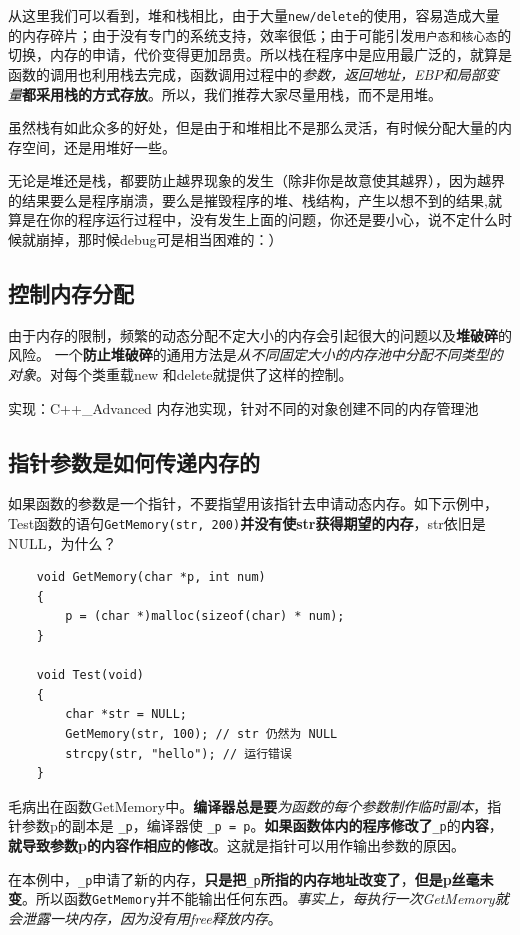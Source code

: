 \documentclass[UTF8,a4paper,12pt]{ctexbook}
\begin{document}
				从这里我们可以看到，堆和栈相比，由于大量\verb|new/delete|的使用，容易造成大量的内存碎片；由于没有专门的系统支持，效率很低；由于可能引发\verb|用户态和核心态|的切换，内存的申请，代价变得更加昂贵。所以栈在程序中是应用最广泛的，就算是函数的调用也利用栈去完成，函数调用过程中的\textit{参数，返回地址，EBP和局部变量}\textbf{都采用栈的方式存放}。所以，我们推荐大家尽量用栈，而不是用堆。
				
				虽然栈有如此众多的好处，但是由于和堆相比不是那么灵活，有时候分配大量的内存空间，还是用堆好一些。
				
				无论是堆还是栈，都要防止越界现象的发生（除非你是故意使其越界），因为越界的结果要么是程序崩溃，要么是摧毁程序的堆、栈结构，产生以想不到的结果,就算是在你的程序运行过程中，没有发生上面的问题，你还是要小心，说不定什么时候就崩掉，那时候debug可是相当困难的：）
		
		\subsection{控制内存分配}
		
			由于内存的限制，频繁的动态分配不定大小的内存会引起很大的问题以及\textbf{堆破碎}的风险。
			一个\textbf{防止堆破碎}的通用方法是\textit{从不同固定大小的内存池中分配不同类型的对象}。对每个类重载new 和delete就提供了这样的控制。
			
			实现：C++\_Advanced 内存池实现，针对不同的对象创建不同的内存管理池
			

		\subsection{指针参数是如何传递内存的}
			如果函数的参数是一个指针，不要指望用该指针去申请动态内存。如下示例中，Test函数的语句\verb|GetMemory(str, 200)|\textbf{并没有使str获得期望的内存}，str依旧是NULL，为什么？
			\begin{lstlisting}
	void GetMemory(char *p, int num)
	{
		p = (char *)malloc(sizeof(char) * num);
	}
	
	void Test(void)
	{
		char *str = NULL;
		GetMemory(str, 100); // str 仍然为 NULL
		strcpy(str, "hello"); // 运行错误
	}
			\end{lstlisting}
			毛病出在函数GetMemory中。\textbf{编译器总是要}\textit{为函数的每个参数制作临时副本}，指针参数p的副本是 \verb|_p|，编译器使 \verb|_p = p|。\textbf{如果函数体内的程序修改了}\verb|_p|的\textbf{内容}，\textbf{就导致参数p的内容作相应的修改}。这就是指针可以用作输出参数的原因。
			
			在本例中，\verb|_p|申请了新的内存，\textbf{只是把}\verb|_p|\textbf{所指的内存地址改变了}，\textbf{但是p丝毫未变}。所以函数\verb|GetMemory|并不能输出任何东西。\textit{事实上，每执行一次GetMemory就会泄露一块内存，因为没有用free释放内存}。
			
\end{document}
